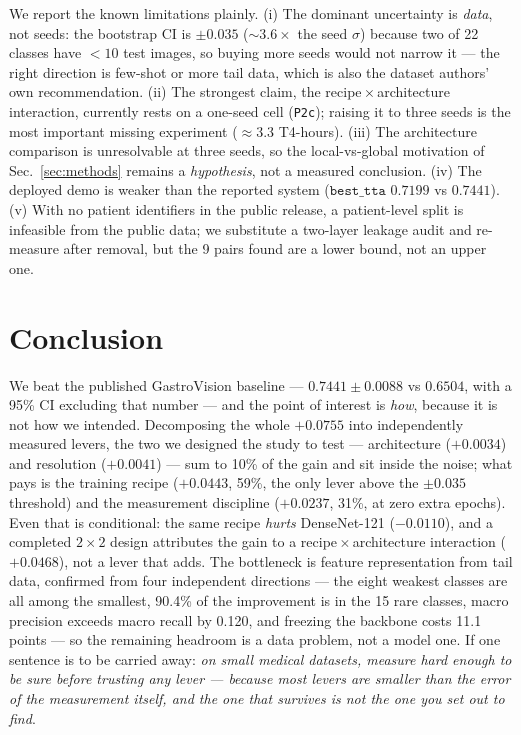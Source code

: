 \documentclass[11pt,a4paper]{article}
\begin{document}
We report the known limitations plainly. (i) The dominant uncertainty is
\emph{data}, not seeds: the bootstrap CI is $\pm0.035$ ($\sim3.6\times$ the seed
$\sigma$) because two of 22 classes have $<10$ test images, so buying more seeds
would not narrow it --- the right direction is few-shot or more tail data, which
is also the dataset authors' own recommendation. (ii) The strongest claim, the
recipe\,$\times$\,architecture interaction, currently rests on a one-seed cell
(\texttt{P2c}); raising it to three seeds is the most important missing
experiment ($\approx3.3$ T4-hours). (iii) The architecture comparison is
unresolvable at three seeds, so the local-vs-global motivation of
Sec.~\ref{sec:methods} remains a \emph{hypothesis}, not a measured conclusion.
(iv) The deployed demo is weaker than the reported system ($\texttt{best\_tta}$
$0.7199$ vs $0.7441$). (v) With no patient identifiers in the public release, a
patient-level split is infeasible from the public data; we substitute a two-layer
leakage audit and re-measure after removal, but the 9 pairs found are a lower
bound, not an upper one.

\section{Conclusion}
We beat the published GastroVision baseline --- $0.7441\pm0.0088$ vs $0.6504$,
with a 95\% CI excluding that number --- and the point of interest is
\emph{how}, because it is not how we intended. Decomposing the whole $+0.0755$
into independently measured levers, the two we designed the study to test ---
architecture ($+0.0034$) and resolution ($+0.0041$) --- sum to 10\% of the gain
and sit inside the noise; what pays is the training recipe ($+0.0443$, 59\%, the
only lever above the $\pm0.035$ threshold) and the measurement discipline
($+0.0237$, 31\%, at zero extra epochs). Even that is conditional: the same
recipe \emph{hurts} DenseNet-121 ($-0.0110$), and a completed $2{\times}2$
design attributes the gain to a recipe\,$\times$\,architecture interaction
($+0.0468$), not a lever that adds. The bottleneck is feature representation
from tail data, confirmed from four independent directions --- the eight weakest
classes are all among the smallest, 90.4\% of the improvement is in the 15 rare
classes, macro precision exceeds macro recall by 0.120, and freezing the
backbone costs 11.1 points --- so the remaining headroom is a data problem, not a
model one. If one sentence is to be carried away: \emph{on small medical
datasets, measure hard enough to be sure before trusting any lever --- because
most levers are smaller than the error of the measurement itself, and the one
that survives is not the one you set out to find}.
\end{document}
